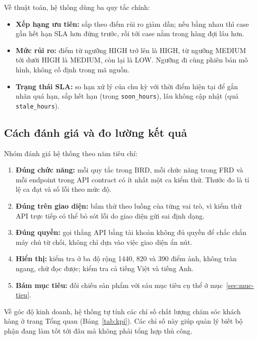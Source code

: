 Về thuật toán, hệ thống dùng ba quy tắc chính:
\begin{itemize}
    \item \textbf{Xếp hạng ưu tiên:} sắp theo điểm rủi ro giảm dần; nếu bằng nhau thì case gần hết
    hạn SLA hơn đứng trước, rồi tới case nằm trong hàng đợi lâu hơn.
    \item \textbf{Mức rủi ro:} điểm từ ngưỡng HIGH trở lên là HIGH, từ ngưỡng MEDIUM tới dưới HIGH là
    MEDIUM, còn lại là LOW. Ngưỡng đi cùng phiên bản mô hình, không cố định trong mã nguồn.
    \item \textbf{Trạng thái SLA:} so hạn xử lý của chu kỳ với thời điểm hiện tại để gắn nhãn quá
    hạn, sắp hết hạn (trong \texttt{soon\_hours}), lâu không cập nhật (quá \texttt{stale\_hours}).
\end{itemize}

\subsection{Cách đánh giá và đo lường kết quả}

Nhóm đánh giá hệ thống theo năm tiêu chí:

\begin{enumerate}
    \item \textbf{Đúng chức năng:} mỗi quy tắc trong BRD, mỗi chức năng trong FRD và mỗi endpoint
    trong API contract có ít nhất một ca kiểm thử. Thước đo là tỉ lệ ca đạt và số lỗi theo mức độ.
    \item \textbf{Đúng trên giao diện:} bấm thử theo luồng của từng vai trò, vì kiểm thử API trực
    tiếp có thể bỏ sót lỗi do giao diện gửi sai định dạng.
    \item \textbf{Đúng quyền:} gọi thẳng API bằng tài khoản không đủ quyền để chắc chắn máy chủ từ
    chối, không chỉ dựa vào việc giao diện ẩn nút.
    \item \textbf{Hiển thị:} kiểm tra ở ba độ rộng 1440, 820 và 390 điểm ảnh, không tràn ngang, chữ
    đọc được; kiểm tra cả tiếng Việt và tiếng Anh.
    \item \textbf{Bám mục tiêu:} đối chiếu sản phẩm với sáu mục tiêu cụ thể ở mục~\ref{sec:muc-tieu}.
\end{enumerate}

Về góc độ kinh doanh, hệ thống tự tính các chỉ số chất lượng chăm sóc khách hàng ở trang Tổng quan
(Bảng~\ref{tab:kpi}). Các chỉ số này giúp quản lý biết bộ phận đang làm tốt tới đâu mà không phải
tổng hợp thủ công.

